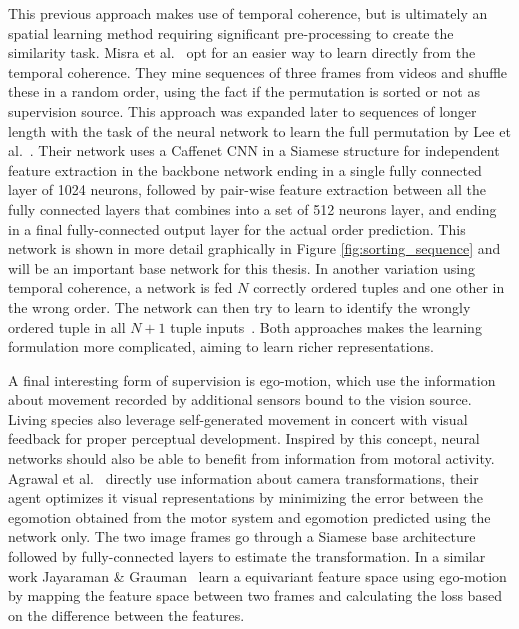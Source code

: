 This previous approach makes use of temporal coherence, but is ultimately an spatial learning method requiring significant pre-processing to create the similarity task. Misra et al.~\cite{misra2016} opt for an easier way to learn directly from the temporal coherence. They mine sequences of three frames from videos and shuffle these in a random order, using the fact if the permutation is sorted or not as supervision source. This approach was expanded later to sequences of longer length with the task of the neural network to learn the full permutation by Lee et al.~\cite{lee2017}. Their network uses a Caffenet\cite{jia2014} CNN in a Siamese structure for independent feature extraction in the backbone network ending in a single fully connected layer of 1024 neurons, followed by pair-wise feature extraction between all the fully connected layers that combines into a set of 512 neurons layer, and ending in a final fully-connected output layer for the actual order prediction. This network is shown in more detail graphically in Figure \ref{fig:sorting_sequence} and will be an important base network for this thesis. In another variation using temporal coherence, a network is fed $N$ correctly ordered tuples and one other in the wrong order. The network can then try to learn to identify the wrongly ordered tuple in all $N+1$ tuple inputs~\cite{fernando2017}. Both approaches makes the learning formulation more complicated, aiming to learn richer representations. 

A final interesting form of supervision is ego-motion, which use the information about movement recorded by additional sensors bound to the vision source. Living species also leverage self-generated movement in concert with visual feedback for proper perceptual development. Inspired by this concept, neural networks should also be able to benefit from information from motoral activity. Agrawal et al.~\cite{agrawal2015} directly use information about camera transformations, their agent optimizes it visual representations by minimizing the error between the egomotion obtained from the motor system and egomotion predicted using the network only. The two image frames go through a Siamese base architecture followed by fully-connected layers to estimate the transformation. In a similar work Jayaraman \& Grauman~\cite{jayaraman2015} learn a equivariant feature space using ego-motion by mapping the feature space between two frames and calculating the loss based on the difference between the features.


